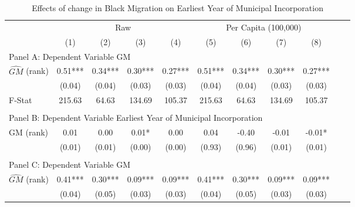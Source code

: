  \begin{table}[htbp]\centering {} \begin{threeparttable} \caption{Effects of change in Black Migration on Earliest Year of Municipal Incorporation} \begin{tabular}{l*{10}{c}} \toprule
                &\multicolumn{4}{c}{Raw}                                    &\multicolumn{4}{c}{Per Capita (100,000)}                   \\\cmidrule(lr){2-5}\cmidrule(lr){6-9}
                &\multicolumn{1}{c}{(1)}   &\multicolumn{1}{c}{(2)}   &\multicolumn{1}{c}{(3)}   &\multicolumn{1}{c}{(4)}   &\multicolumn{1}{c}{(5)}   &\multicolumn{1}{c}{(6)}   &\multicolumn{1}{c}{(7)}   &\multicolumn{1}{c}{(8)}   \\
\cmidrule(lr){1-9}
\multicolumn{8}{l}{Panel A: Dependent Variable GM}\\
\cmidrule(lr){1-9}
$\hat{GM}$ (rank)&       0.51***&       0.34***&       0.30***&       0.27***&       0.51***&       0.34***&       0.30***&       0.27***\\
                &     (0.04)   &     (0.04)   &     (0.03)   &     (0.03)   &     (0.04)   &     (0.04)   &     (0.03)   &     (0.03)   \\
\midrule
F-Stat          &     215.63   &      64.63   &     134.69   &     105.37   &     215.63   &      64.63   &     134.69   &     105.37   \\
\cmidrule[\heavyrulewidth](lr){1-9} \\ \cmidrule[\heavyrulewidth](lr){1-9}
\multicolumn{8}{l}{Panel B: Dependent Variable Earliest Year of Municipal Incorporation}\\
\cmidrule(lr){1-9}
GM  (rank)      &       0.01   &       0.00   &       0.01*  &       0.00   &       0.04   &      -0.40   &      -0.01   &      -0.01*  \\
                &     (0.01)   &     (0.01)   &     (0.00)   &     (0.00)   &     (0.93)   &     (0.96)   &     (0.01)   &     (0.01)   \\
\cmidrule[\heavyrulewidth](lr){1-9} \\ \cmidrule[\heavyrulewidth](lr){1-9}
\multicolumn{8}{l}{Panel C: Dependent Variable GM}\\
\cmidrule(lr){1-9}
$\hat{GM}$ (rank)&       0.41***&       0.30***&       0.09***&       0.09***&       0.41***&       0.30***&       0.09***&       0.09***\\
                &     (0.04)   &     (0.05)   &     (0.03)   &     (0.03)   &     (0.04)   &     (0.05)   &     (0.03)   &     (0.03)   \\

\end{tabular}
\end{threeparttable}
\end{table}
